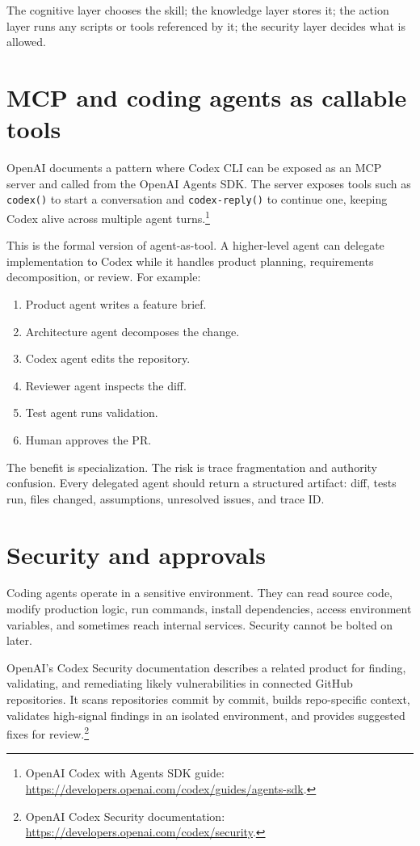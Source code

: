 The cognitive layer chooses the skill; the knowledge layer stores it; the action layer runs any scripts or tools referenced by it; the security layer decides what is allowed.

\section{MCP and coding agents as callable tools}

OpenAI documents a pattern where Codex CLI can be exposed as an MCP server and called from the OpenAI Agents SDK. The server exposes tools such as \texttt{codex()} to start a conversation and \texttt{codex-reply()} to continue one, keeping Codex alive across multiple agent turns.\footnote{OpenAI Codex with Agents SDK guide: \url{https://developers.openai.com/codex/guides/agents-sdk}.}

This is the formal version of agent-as-tool. A higher-level agent can delegate implementation to Codex while it handles product planning, requirements decomposition, or review. For example:

\begin{enumerate}[leftmargin=*]
  \item Product agent writes a feature brief.
  \item Architecture agent decomposes the change.
  \item Codex agent edits the repository.
  \item Reviewer agent inspects the diff.
  \item Test agent runs validation.
  \item Human approves the PR.
\end{enumerate}

The benefit is specialization. The risk is trace fragmentation and authority confusion. Every delegated agent should return a structured artifact: diff, tests run, files changed, assumptions, unresolved issues, and trace ID.

\section{Security and approvals}

Coding agents operate in a sensitive environment. They can read source code, modify production logic, run commands, install dependencies, access environment variables, and sometimes reach internal services. Security cannot be bolted on later.

OpenAI's Codex Security documentation describes a related product for finding, validating, and remediating likely vulnerabilities in connected GitHub repositories. It scans repositories commit by commit, builds repo-specific context, validates high-signal findings in an isolated environment, and provides suggested fixes for review.\footnote{OpenAI Codex Security documentation: \url{https://developers.openai.com/codex/security}.}

